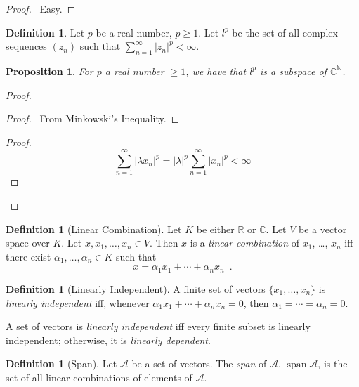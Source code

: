 \documentclass{book}
\let\qed\relax
\newtheorem{prop}[ax]{Proposition}
\theoremstyle{definition}
\newtheorem{df}[ax]{Definition}
\newcommand{\spn}{\ensuremath{\operatorname{span}}}
\begin{document}
\begin{proof}
\pf\ Easy. \qed
\end{proof}

\begin{df}
Let $p$ be a real number, $p \geq 1$. Let $l^p$ be the set of all complex sequences $(z_n)$ such that $\sum_{n=1}^\infty |z_n|^p < \infty$.
\end{df}

\begin{prop}
For $p$ a real number $\geq 1$, we have that $l^p$ is a subspace of $\mathbb{C}^\mathbb{N}$.
\end{prop}

\begin{proof}
\pf
{}
\begin{proof}
	\pf\ From Minkowski's Inequality.
\end{proof}
\begin{proof}
	\pf
	\[ \sum_{n=1}^\infty |\lambda x_n|^p = |\lambda|^p \sum_{n=1}^\infty |x_n|^p < \infty \]
\end{proof}
\qed
\end{proof}

\begin{df}[Linear Combination]
Let $K$ be either $\mathbb{R}$ or $\mathbb{C}$. Let $V$ be a vector space over $K$. Let $x, x_1, \ldots, x_n \in V$. Then $x$ is a \emph{linear combination} of $x_1$, \ldots, $x_n$ iff there exist $\alpha_1, \ldots, \alpha_n \in K$ such that
\[ x = \alpha_1 x_1 + \cdots + \alpha_n x_n \enspace . \]
\end{df}

\begin{df}[Linearly Independent]
A finite set of vectors $\{x_1, \ldots, x_n\}$ is \emph{linearly independent} iff, whenever $\alpha_1 x_1 + \cdots + \alpha_n x_n = 0$, then $\alpha_1 = \cdots = \alpha_n = 0$.

A set of vectors is \emph{linearly independent} iff every finite subset is linearly independent; otherwise, it is \emph{linearly dependent}.
\end{df}

\begin{df}[Span]
Let $\mathcal{A}$ be a set of vectors. The \emph{span} of $\mathcal{A}$, $\spn \mathcal{A}$, is the set of all linear combinations of elements of $\mathcal{A}$.
\end{df}
\end{document}
